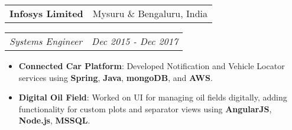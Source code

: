 \documentclass[letterpaper,11pt]{article}
\makeatletter
\newcommand{\resumeItem}[2]{
  \item\small{
    \textbf{#1}{: #2 \vspace{-2pt}}
  }
}
\newcommand{\resumeSubheading}[2]{
  \vspace{-1pt}\item
    \begin{tabular*}{0.97\textwidth}[t]{l@{\extracolsep{\fill}}r}
      \textbf{#1} & #2 \\
    \end{tabular*}
}
\newcommand{\resumeSubSubheading}[2]{
    \begin{tabular*}{0.97\textwidth}[t]{l@{\extracolsep{\fill}}r}
      \textit{\small#1} & \textit{\small #2} \\
    \end{tabular*}\vspace{-5pt}
}
\newcommand{\resumeItemListStart}{\begin{itemize}}
\newcommand{\resumeItemListEnd}{\end{itemize}\vspace{-5pt}}
\makeatother
\begin{document}
    \resumeSubheading
      {Infosys Limited}{Mysuru \& Bengaluru, India}
      \resumeSubSubheading
        {Systems Engineer}{Dec 2015 - Dec 2017}
        \resumeItemListStart
          \resumeItem{Connected Car Platform}
            {Developed Notification and Vehicle Locator services using \textbf{Spring}, \textbf{Java}, \textbf{mongoDB}, and \textbf{AWS}.}

          \resumeItem{Digital Oil Field}
            {Worked on UI for managing oil fields digitally, adding functionality for custom plots and separator views using \textbf{AngularJS}, \textbf{Node.js}, \textbf{MSSQL}.}
        \resumeItemListEnd
\end{document}
